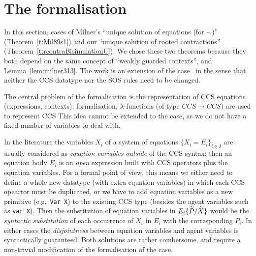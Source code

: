 
\section{The \multivariate formalisation}
\label{sec:multivariate}

In this section,   \multivariate
cases of Milner's ``unique solution of equations (for $\sim$)''
(Theorem~\ref{t:Mil89s1}) and our ``unique solution of rooted
contractions'' (Theorem~\ref{t:rcontraBisimulationU}).
We chose these two theorems because they both depend on the same
concept of ``weakly guarded contexts'', and Lemma~\ref{lem:milner313}.
The work is an extension of the \univariate case~\cite{EPTCS276.10}
 in the sense that neither the CCS datatype nor
the SOS rules need to be changed.

The central problem of the \multivariate formalisation is the
representation of CCS equations (expressions, contexts).
 \univariate formalisation, $\lambda$-functions (of type
$CCS\rightarrow CCS$) are used to represent \univariate CCS
This idea cannot be extended to the \multivariate case, as
we do not have a fixed number of variables to deal with.

In the  literature the variables  $X_i$ of
a system of equations $\{X_i = E_i\}_{i\in I}$ are usually considered as
\emph{equation variables}
\emph{outside} of the CCS syntax; then an equation body  $E_i$  is an \emph{open} expression
built with CCS operators plus the equation variables.
For a formal point of view, this means we either need to define a
whole new datatype (with extra equation variables) in which each CCS
opeartor must be duplicated, or we have to  add equation variables as a
new primitive (e.g.~\texttt{Var X}) to the existing CCS type (besides
the agent variables such as  \texttt{var X}).
 Then the substitution of equation
variables in $E_i\{\widetilde P/\widetilde X\}$ would be the \emph{syntactic substitution} of
each occurrence of $X_i$ in $E_i$ with the corresponding $P_i$.
In either cases the \emph{disjointness} between equation variables and
agent variables is syntactically
guaranteed. Both solutions are rather combersome, and require a non-trivial modification
of the formalisation of the \univariate case.

